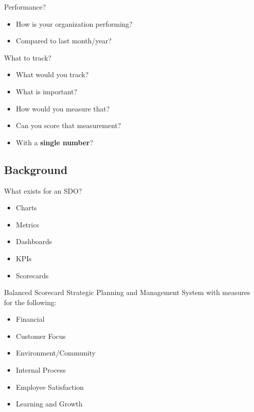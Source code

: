 \begin{frame}{Performance?}
  \begin{itemize}
      \item How is your organization performing?
      \item Compared to last month/year?
  \end{itemize}
\end{frame}

\begin{frame}{What to track?}
  \begin{itemize}
      \item What would you track?
      \item What is important?
      \item How would you measure that?
      \item Can you score that measurement?
      \item With a \textbf{single number}?
  \end{itemize}
\end{frame}


\subsection{Background}

\begin{frame}{What exists for an SDO?}
  \begin{itemize}
      \item Charts
      \item Metrics
      \item Dashboards
      \item KPIs
      \item Scorecards
  \end{itemize}
\end{frame}

\begin{frame}{Balanced Scorecard}
    Strategic Planning and Management System with measures for the following:
    
    \begin{itemize}
      \item Financial 
      \item Customer Focus
      \item Environment/Community
      \item Internal Process
      \item Employee Satisfaction
      \item Learning and Growth
    \end{itemize}
\end{frame}


